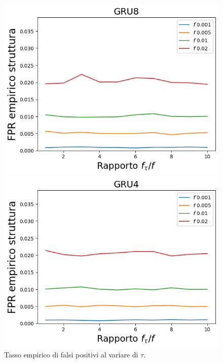 \documentclass{beamer}
\begin{document}
\begin{frame}
\begin{figure}[htbp]
        \hfill
        \begin{minipage}{0.25\textwidth}
        \centering
        \includegraphics[width=\textwidth]{immagini/7/SLBF/GRU8_FPR.png}
        \end{minipage}%
        \hfill
        \begin{minipage}{0.25\textwidth}
        \centering
        \includegraphics[width=\textwidth]{immagini/7/SLBF/GRU4_FPR.png}
        \end{minipage}%
        \hfill
    
        \begin{minipage}[t]{\textwidth}
        \centering
        \caption{Tasso empirico di falsi positivi al variare di $\tau$.}
        \end{minipage}%
    

\end{figure}
\end{frame}
\end{document}
